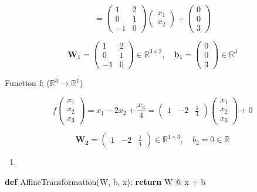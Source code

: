 \documentclass[
  letterpaper,
  DIV=11,
  numbers=noendperiod]{scrartcl}
\newenvironment{Shaded}{\begin{snugshade}}{\end{snugshade}}
\newcommand{\ControlFlowTok}[1]{\textcolor[rgb]{0.00,0.23,0.31}{\textbf{#1}}}
\newcommand{\KeywordTok}[1]{\textcolor[rgb]{0.00,0.23,0.31}{\textbf{#1}}}
\newcommand{\NormalTok}[1]{\textcolor[rgb]{0.00,0.23,0.31}{#1}}
\newcommand{\OperatorTok}[1]{\textcolor[rgb]{0.37,0.37,0.37}{#1}}
\providecommand{\tightlist}{%
  \setlength{\itemsep}{0pt}\setlength{\parskip}{0pt}}\usepackage{longtable,booktabs,array}
\begin{document}
\[= \begin{pmatrix}1 & 2\\0 & 1\\-1 & 0\end{pmatrix}\begin{pmatrix}x_1\\x_2\end{pmatrix} + \begin{pmatrix}0\\0\\3\end{pmatrix}\]

\[\mathbf{W_1} = \begin{pmatrix}1 & 2\\0 & 1\\-1 & 0\end{pmatrix} \in \mathbb{R}^{3 \times 2}, \quad \mathbf{b_1} = \begin{pmatrix}0\\0\\3\end{pmatrix} \in \mathbb{R}^3\]

Function f: (\(\mathbb{R}^{3} \rightarrow \mathbb{R}^{1}\))

\[f\begin{pmatrix}x_1\\x_2\\x_3\end{pmatrix} = x_1 - 2x_2 + \frac{x_3}{4} = \begin{pmatrix}1 & -2 & \frac{1}{4}\end{pmatrix}\begin{pmatrix}x_1\\x_2\\x_3\end{pmatrix} + 0\]

\[\mathbf{W_2} = \begin{pmatrix}1 & -2 & \frac{1}{4}\end{pmatrix} \in \mathbb{R}^{1 \times 3}, \quad b_2 = 0 \in \mathbb{R}\]

\begin{enumerate}
\def\labelenumi{\arabic{enumi}.}
\setcounter{enumi}{1}
\tightlist
\item
\end{enumerate}

\begin{Shaded}
\begin{Highlighting}[]
\KeywordTok{def}\NormalTok{ AffineTransformation(W, b, x):}
    \ControlFlowTok{return}\NormalTok{ W }\OperatorTok{@}\NormalTok{ x }\OperatorTok{+}\NormalTok{ b}
\end{Highlighting}
\end{Shaded}
\end{document}
